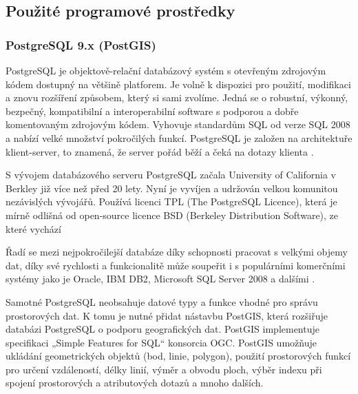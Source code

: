 \subsection{Použité programové prostředky}

\subsubsection{PostgreSQL 9.x (PostGIS)}
        \label{PostgreSQL}
        PostgreSQL je objektově-relační databázový systém s otevřeným zdrojovým
        kódem dostupný na většině platforem. Je volně k dispozici pro použití,
        modifikaci a znovu rozšíření způsobem, který si sami zvolíme. Jedná se
        o robustní, výkonný, bezpečný, kompatibilní a interoperabilní software
        s podporou a dobře komentovaným zdrojovým kódem. Vyhovuje standardům
        SQL od verze SQL 2008 a nabízí velké množství pokročilých funkcí.
        PostgreSQL je založen na architektuře klient-server, to znamená, že
        server pořád běží a čeká na dotazy klienta \citep{Momjian2001}. 

        S vývojem databázového serveru PostgreSQL začala University of
        California v Berkley již více než před 20 lety. Nyní je vyvíjen a
        udržován velkou komunitou nezávislých vývojářů. Používá licenci TPL
        (The PostgreSQL Licence), která je mírně odlišná od open-source licence
        BSD (Berkeley Distribution Software), ze které vychází
        \citep{RiggsKrossing2010}

        Řadí se mezi nejpokročilejší databáze díky schopnosti pracovat s
        velkými objemy dat, díky své rychlosti a funkcionalitě může soupeřit i
        s populárními komerčními systémy jako je Oracle, IBM DB2, Microsoft SQL
        Server 2008 a dalšími \citep{PostgreSQL2012}.

        Samotné PostgreSQL neobsahuje datové typy a funkce vhodné pro správu
        prostorových dat. K tomu je nutné přidat nástavbu PostGIS, která
        rozšiřuje databázi PostgreSQL o podporu geografických dat. PostGIS
        implementuje specifikaci „Simple Features for SQL“ konsorcia OGC.
        PostGIS umožňuje ukládání geometrických objektů (bod, linie, polygon),
        použití prostorových funkcí pro určení vzdáleností, délky linií, výměr
        a obvodu ploch, výběr indexu při spojení prostorových a atributových
        dotazů a mnoho dalších.


